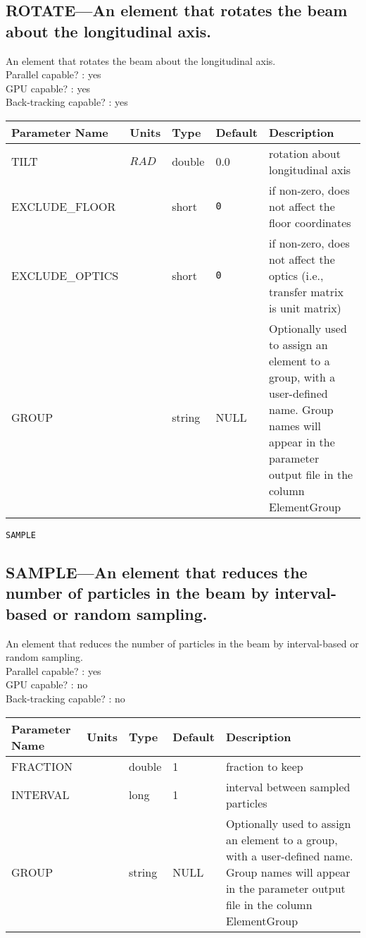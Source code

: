 \subsection{ROTATE---An element that rotates the beam about the longitudinal axis.}
An element that rotates the beam about the longitudinal axis.
\\
Parallel capable? : yes\\
GPU capable? : yes\\
Back-tracking capable? : yes\\
\begin{tabular}{|l|l|l|l|p{\descwidth}|} \hline
Parameter Name & Units & Type & Default & Description \\ \hline 
TILT & $RAD$ & double &  0.0 & rotation about longitudinal axis  \\ \hline 
EXCLUDE\_FLOOR &  & short &  \verb|0| & if non-zero, does not affect the floor coordinates  \\ \hline 
EXCLUDE\_OPTICS &  & short &  \verb|0| & if non-zero, does not affect the optics (i.e., transfer matrix is unit matrix)  \\ \hline 
GROUP &  & string & NULL & Optionally used to assign an element to a group, with a user-defined name.  Group names will appear in the parameter output file in the column ElementGroup  \\ \hline 
\end{tabular}

\vspace*{0.5in}

\newpage
\begin{center}{\Large\verb|SAMPLE|}\end{center}
\subsection{SAMPLE---An element that reduces the number of particles in the beam by interval-based or random sampling.}
An element that reduces the number of particles in the beam by interval-based or random sampling.
\\
Parallel capable? : yes\\
GPU capable? : no\\
Back-tracking capable? : no\\
\begin{tabular}{|l|l|l|l|p{\descwidth}|} \hline
Parameter Name & Units & Type & Default & Description \\ \hline 
FRACTION &  & double &   1 & fraction to keep  \\ \hline 
INTERVAL &  & long &   1               & interval between sampled particles  \\ \hline 
GROUP &  & string & NULL & Optionally used to assign an element to a group, with a user-defined name.  Group names will appear in the parameter output file in the column ElementGroup  \\ \hline 
\end{tabular}

